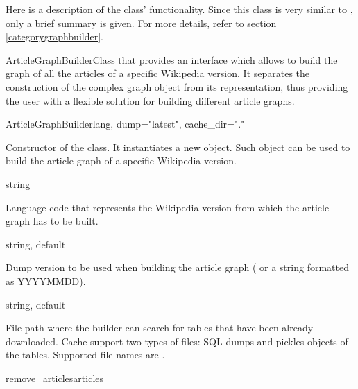             Here is a description of the class' functionality. Since this class is very similar to , only a brief summary is given. For more details, refer to section \ref{categorygraphbuilder}.
            \begin{classdoc}{ArticleGraphBuilder}{Class that provides an interface which allows to build the graph of all the articles of a specific Wikipedia version. It separates the construction of the complex graph object from its representation, thus providing the user with a flexible solution for building different article graphs.}
                \item \begin{classmethod}{ArticleGraphBuilder}{lang, dump="latest", cache\_dir="."}
                
                    \begin{functiondescription}
                        Constructor of the class. It instantiates a new  object. Such object can be used to build the article graph of a specific Wikipedia version.
                    \end{functiondescription}
                    
                    \begin{functionparameters}
                        \item[lang] string
                        
                        Language code that represents the Wikipedia version from which the article graph has to be built.
                        \item[dump] string, default 

                        Dump version to be used when building the article graph ( or a string formatted as YYYYMMDD).
                        \item[cache\_dir] string, default 
                    
                        File path where the builder can search for tables that have been already downloaded. Cache support two types of files: SQL dumps and pickles objects of the tables. Supported file names are .
                    \end{functionparameters}
                \end{classmethod}
                \item \begin{classmethod}{remove\_articles}{articles}
                

\end{classmethod}
\end{classdoc}
